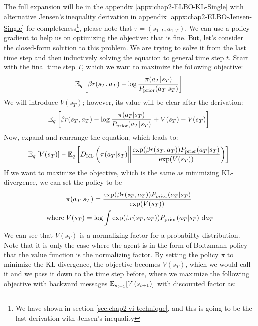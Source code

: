 The full expansion will be in the appendix \ref{appx:chap2-ELBO-KL-Single} with alternative Jensen's inequality derivation in appendix \ref{appx:chap2-ELBO-Jensen-Single} for completeness\footnote{We have shown in section \ref{sec:chap2-vi-technique}, and this is going to be the last derivation with Jensen's inequality}, please note that $\tau = (s_{1:T}, a_{1:T})$. We can use a policy gradient to help us on optimizing the objective: that is fine. But, let's consider the closed-form solution to this problem. We are trying to solve it from the last time step and then inductively solving the equation to general time step $t$. Start with the final time step $T$, which we want to maximize the following objective:
\begin{equation}
    \mathbb{E}_{q} \left[\beta r(s_T, a_T) - \log \frac{\pi(a_T | s_T)}{P_{\text{prior}}(a_T | s_T)}\right]
\end{equation}
We will introduce $V(s_T)$; however, its value will be clear after the derivation: 
\begin{equation}
    \mathbb{E}_{q} \left[\beta r(s_T, a_T) - \log \frac{\pi(a_T | s_T)}{P_{\text{prior}}(a_T | s_T)} + V(s_T) - V(s_T) \right]
\end{equation}
Now, expand and rearrange the equation, which leads to:
\begin{equation}
    \mathbb{E}_q \left[ V(s_T) \right] - \mathbb{E}_q \left[ D_{\mathrm{KL}}\left( \pi(a_T | s_T) \bigg|\bigg| \frac{\exp(\beta r(s_T, a_T)) P_{\text{prior}}(a_T | s_T)}{\exp(V(s_T))} \right) \right]
\end{equation}
If we want to maximize the objective, which is the same as minimizing KL-divergence, we can set the policy to be 
\begin{equation}
    \label{eqn:chap2-soln-policy-terminal}
\begin{aligned}
    &\pi(a_T | s_T) = \frac{\exp(\beta r(s_T, a_T)) P_{\text{prior}}(a_T | s_T)}{\exp(V(s_T))} \\
    \text{ where }& V(s_T) = \log \int \exp(\beta r(s_T, a_T)) P_{\text{prior}}(a_T | s_T) \ \mathrm{d} a_T
\end{aligned}
\end{equation}
We can see that $V(s_T)$ is a normalizing factor for a probability distribution. Note that it is only the case where the agent is in the form of Boltzmann policy that the value function is the normalizing factor. By setting the policy $\pi$ to minimize the KL-divergence, the objective becomes $V(s_T)$, which we would call it  and we pass it down to the time step before, where we maximize the following objective with backward messages $\mathbb{E}_{s_{t+1}}[V\left( s_{t+1} \right)]$ with discounted factor as:
